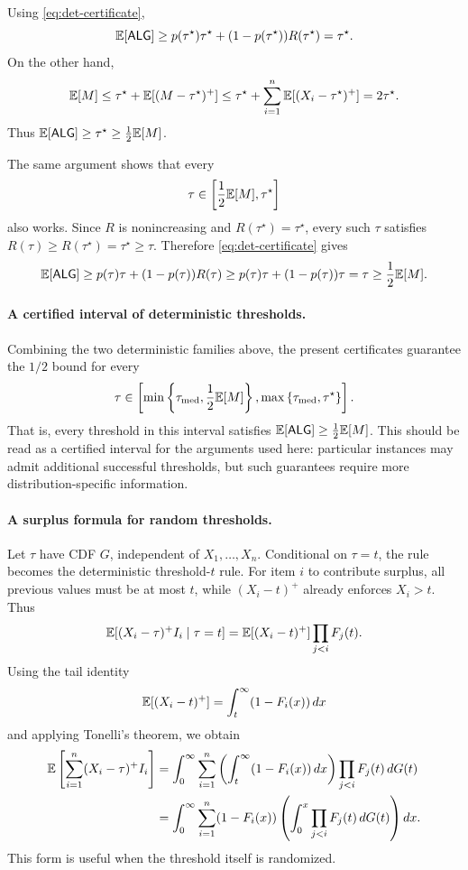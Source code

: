 Using \eqref{eq:det-certificate},
\[
\mathbb{E}[\mathsf{ALG}]
\ge
p(\tau^\star)\tau^\star+(1-p(\tau^\star))R(\tau^\star)
=
\tau^\star.
\]
On the other hand,
\[
\mathbb{E}[M]
\le
\tau^\star+\mathbb{E}[(M-\tau^\star)^+]
\le
\tau^\star+\sum_{i=1}^n\mathbb{E}[(X_i-\tau^\star)^+]
=
2\tau^\star.
\]
Thus $\mathbb{E}[\mathsf{ALG}]\ge \tau^\star\ge \frac12\mathbb{E}[M]$.

The same argument shows that every
\[
\tau\in\left[\frac12\mathbb{E}[M],\tau^\star\right]
\]
also works. Since $R$ is nonincreasing and $R(\tau^\star)=\tau^\star$, every such $\tau$ satisfies $R(\tau)\ge R(\tau^\star)=\tau^\star\ge \tau$. Therefore \eqref{eq:det-certificate} gives
\[
\mathbb{E}[\mathsf{ALG}]
\ge
p(\tau)\tau+(1-p(\tau))R(\tau)
\ge
p(\tau)\tau+(1-p(\tau))\tau
=
\tau
\ge
\frac12\mathbb{E}[M].
\]

\paragraph{A certified interval of deterministic thresholds.}
Combining the two deterministic families above, the present certificates guarantee the $1/2$ bound for every
\[
\tau\in
\left[
\min\left\{\tau_{\mathrm{med}},\frac12\mathbb{E}[M]\right\},
\max\left\{\tau_{\mathrm{med}},\tau^\star\right\}
\right].
\]
That is, every threshold in this interval satisfies $\mathbb{E}[\mathsf{ALG}]\ge \frac12\mathbb{E}[M]$. This should be read as a certified interval for the arguments used here: particular instances may admit additional successful thresholds, but such guarantees require more distribution-specific information.

\paragraph{A surplus formula for random thresholds.}
Let $\tau$ have CDF $G$, independent of $X_1,\ldots,X_n$. Conditional on $\tau=t$, the rule becomes the deterministic threshold-$t$ rule. For item $i$ to contribute surplus, all previous values must be at most $t$, while $(X_i-t)^+$ already enforces $X_i>t$. Thus
\[
\mathbb{E}[(X_i-\tau)^+I_i\mid \tau=t]
=
\mathbb{E}[(X_i-t)^+]\prod_{j<i}F_j(t).
\]
Using the tail identity
\[
\mathbb{E}[(X_i-t)^+]=\int_t^\infty (1-F_i(x))\,dx
\]
and applying Tonelli's theorem, we obtain
\begin{equation}
\begin{aligned}
\mathbb{E}\left[\sum_{i=1}^n (X_i-\tau)^+I_i\right]
&=
\int_0^\infty
\sum_{i=1}^n
\left(\int_t^\infty (1-F_i(x))\,dx\right)
\prod_{j<i}F_j(t)\,dG(t) \\
&=
\int_0^\infty
\sum_{i=1}^n (1-F_i(x))
\left(
\int_0^x \prod_{j<i}F_j(t)\,dG(t)
\right)dx.
\end{aligned}
\label{eq:random-surplus}
\end{equation}
This form is useful when the threshold itself is randomized.

